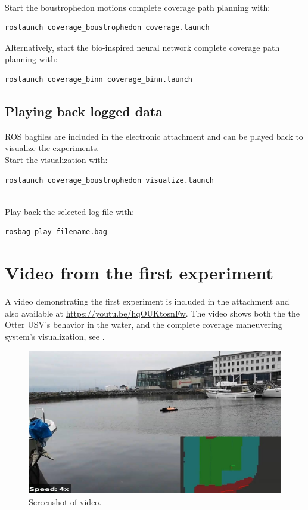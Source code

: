 \noindent \\ Start the boustrophedon motions complete coverage path planning with:
\begin{lstlisting}[language=bash]
roslaunch coverage_boustrophedon coverage.launch
\end{lstlisting}
\noindent Alternatively, start the bio-inspired neural network complete coverage path planning with:
\begin{lstlisting}[language=bash]
roslaunch coverage_binn coverage_binn.launch
\end{lstlisting}

\section{Playing back logged data}

ROS bagfiles are included in the electronic attachment and can be played back to visualize the experiments. \\

\noindent Start the visualization with:
\begin{lstlisting}[language=bash]
roslaunch coverage_boustrophedon visualize.launch
\end{lstlisting}

\noindent \\ Play back the selected log file with:
\begin{lstlisting}[language=bash]
rosbag play filename.bag
\end{lstlisting}



\chapter{Video from the first experiment}

A video demonstrating the first experiment is included in the attachment and also available at \url{https://youtu.be/hqOUKtosnFw}. The video shows both the the Otter USV's behavior in the water, and the complete coverage maneuvering system's visualization, see .

\begin{figure}[h!]
	\centering
	\includegraphics[width=1\textwidth]{fig/video.jpg}
	\caption{Screenshot of video.}
	\label{fig:video}
\end{figure}


